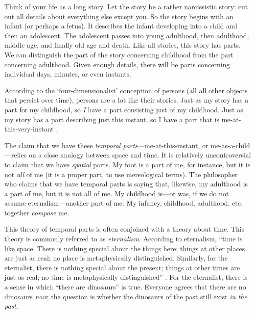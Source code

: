 \documentclass[11pt]{article}
\newenvironment{squote}{%
\begin{spacing}{1}
\begin{list}{}{%
\setlength{\labelwidth}{0pt}%
\rightmargin\leftmargin%
}
\item\relax
}{%
\end{list}%
\end{spacing}
}
\begin{document}
\begin{spacing}{1.5}
\begin{squote}
Think of your life as a long story.  Let the story be a rather
narcissistic story: cut out all details about everything else except
you.  So the story begins with an infant (or perhaps a fetus).  It
describes the infant developing into a child and then an adolescent.
The adolescent passes into young adulthood, then adulthood, middle
age, and finally old age and death.  Like all stories, this story has
parts.  We can distinguish the part of the story concerning childhood
from the part concerning adulthood.  Given enough details, there will
be parts concerning individual days, minutes, or even instants.

According to the `four-dimensionalist' conception of persons (all all
other objects that persist over time), persons are a lot like their
stories.  Just as my story has a part for my childhood, so {\em I}
have a part consisting just of my childhood.  Just as my story has a
part describing just this instant, so I have a part that is
me-at-this-very-instant \citeyearpar[1]{sider2001}.
\end{squote}

The claim that we have these {\em temporal
  parts}---me-at-this-instant, or me-as-a-child---relies on a close
analogy between space and time.  It is relatively uncontroversial to
claim that we have {\em spatial} parts.  My foot is a part of me, for
instance, but it is not {\em all} of me (it is a proper part, to use
mereological terms).  The philosopher who claims that we have temporal
parts is saying that, likewise, my adulthood is a part of me, but it
is not all of me.  My childhood is---or was, if we do not assume
eternalism---another part of me.  My infancy, childhood, adulthood,
etc. together {\em compose} me.

This theory of temporal parts is often conjoined with a theory about
time.  This theory is commonly referred to as {\em eternalism}.
According to eternalism, ``time is like space.  There is nothing
special about the things here; things at other places are just as
real; no place is metaphysically distinguished.  Similarly, for the
eternalist, there is nothing special about the present; things at
other times are just as real; no time is metaphysically
distinguished'' \citep[122]{hinchliff1996}.  For the eternalist, there
is a sense in which ``there are dinosaurs'' is true.  Everyone agrees
that there are no dinosaurs {\em now}; the question is whether the
dinosaurs of the past still exist {\em in the past}.  


\end{spacing}
\end{document}
